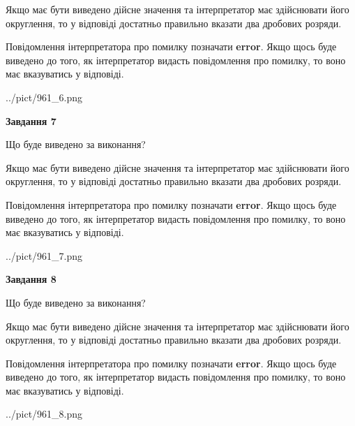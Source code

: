 \documentclass[12pt, ukrainian]{article}
\begin{document}
{\begin {Large}
Якщо має бути виведено дійсне значення та інтерпретатор має здійснювати його округлення, 
то у відповіді достатньо правильно вказати два дробових розряди.

Повідомлення інтерпретатора про помилку позначати \textbf{error}.
Якщо щось буде виведено до того, як інтерпретатор видасть повідомлення про помилку, 
то воно має вказуватись у відповіді. \par

\begin{center}
	{../pict/961_6.png}
\end{center}
\newpage

{\begin {center}\textbf{Завдання 7}\end {center}}\par
Що буде виведено за виконання? \par

Якщо має бути виведено дійсне значення та інтерпретатор має здійснювати його округлення, 
то у відповіді достатньо правильно вказати два дробових розряди.

Повідомлення інтерпретатора про помилку позначати \textbf{error}.
Якщо щось буде виведено до того, як інтерпретатор видасть повідомлення про помилку, 
то воно має вказуватись у відповіді. \par

\begin{center}
	{../pict/961_7.png}
\end{center}
\newpage

{\begin {center}\textbf{Завдання 8}\end {center}}\par
Що буде виведено за виконання? \par

Якщо має бути виведено дійсне значення та інтерпретатор має здійснювати його округлення, 
то у відповіді достатньо правильно вказати два дробових розряди.

Повідомлення інтерпретатора про помилку позначати \textbf{error}.
Якщо щось буде виведено до того, як інтерпретатор видасть повідомлення про помилку, 
то воно має вказуватись у відповіді. \par

\begin{center}
	{../pict/961_8.png}
\end{center}
\newpage


\end{Large}}
\end{document}
